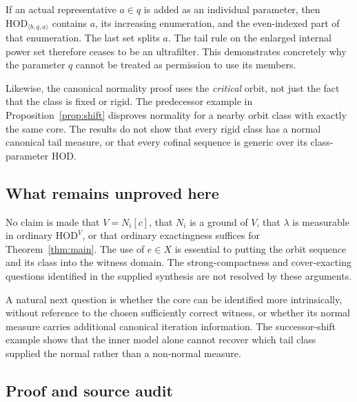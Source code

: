 \documentclass[11pt,letterpaper]{article}
\theoremstyle{definition}
\newcommand{\HOD}{\mathrm{HOD}}
\begin{document}
If an actual representative $a\in q$ is added as an individual parameter, then $\HOD_{\langle b,q,a\rangle}$ contains $a$, its increasing enumeration, and the even-indexed part of that enumeration. The last set splits $a$. The tail rule on the enlarged internal power set therefore ceases to be an ultrafilter. This demonstrates concretely why the parameter $q$ cannot be treated as permission to use its members.

Likewise, the canonical normality proof uses the \emph{critical} orbit, not just the fact that the class is fixed or rigid. The predecessor example in Proposition~\ref{prop:shift} disproves normality for a nearby orbit class with exactly the same core. The results do not show that every rigid class has a normal canonical tail measure, or that every cofinal sequence is generic over its class-parameter HOD.

\subsection{What remains unproved here}

No claim is made that $V=N_i[c]$, that $N_i$ is a ground of $V$, that $\lambda$ is measurable in ordinary $\HOD^V$, or that ordinary exactingness suffices for Theorem~\ref{thm:main}. The use of $e\in X$ is essential to putting the orbit sequence and its class into the witness domain. The strong-compactness and cover-exacting questions identified in the supplied synthesis are not resolved by these arguments.

A natural next question is whether the core can be identified more intrinsically, without reference to the chosen sufficiently correct witness, or whether its normal measure carries additional canonical iteration information. The successor-shift example shows that the inner model alone cannot recover which tail class supplied the normal rather than a non-normal measure.

\subsection{Proof and source audit}
\end{document}
